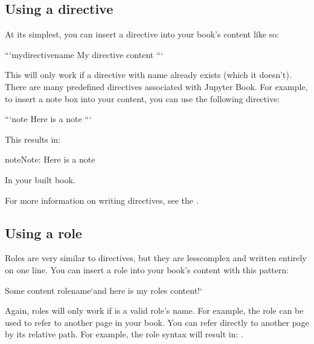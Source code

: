 \documentclass[letterpaper,10pt,english]{sphinxmanual}
\begin{document}
\subsection{Using a directive}
\label{\detokenize{Part1/markdown:using-a-directive}}
At its simplest, you can insert a directive into your book’s content like so:

\begin{sphinxVerbatim}[commandchars=\\\{\}]
```\PYGZob{}mydirectivename\PYGZcb{}
My directive content
```
\end{sphinxVerbatim}

This will only work if a directive with name  already exists
(which it doesn’t). There are many pre\sphinxhyphen{}defined directives associated with
Jupyter Book. For example, to insert a note box into your content, you can
use the following directive:

\begin{sphinxVerbatim}[commandchars=\\\{\}]
```\PYGZob{}note\PYGZcb{}
Here is a note
```
\end{sphinxVerbatim}

This results in:

\begin{sphinxadmonition}{note}{Note:}
Here is a note
\end{sphinxadmonition}

In your built book.

For more information on writing directives, see the
.


\subsection{Using a role}
\label{\detokenize{Part1/markdown:using-a-role}}
Roles are very similar to directives, but they are less\sphinxhyphen{}complex and written
entirely on one line. You can insert a role into your book’s content with
this pattern:

\begin{sphinxVerbatim}[commandchars=\\\{\}]
Some content \PYGZob{}rolename\PYGZcb{}`and here is my role\PYGZsq{}s content!`
\end{sphinxVerbatim}

Again, roles will only work if  is a valid role’s name. For example,
the  role can be used to refer to another page in your book. You can
refer directly to another page by its relative path. For example, the
role syntax  will result in: .
\end{document}
